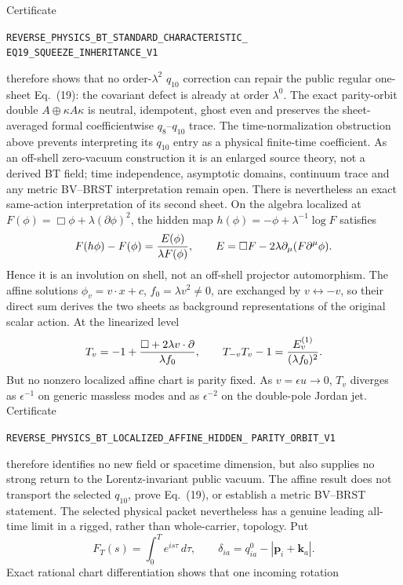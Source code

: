 \documentclass[11pt]{article}
\theoremstyle{definition}
\theoremstyle{remark}
\begin{document}
Certificate
\par\noindent
\texttt{REVERSE\_PHYSICS\_BT\_STANDARD\_CHARACTERISTIC\_}\allowbreak
\texttt{EQ19\_SQUEEZE\_INHERITANCE\_V1}
\par\noindent
therefore shows that no order-\(\lambda^2\) \(q_{10}\) correction can repair
the public regular one-sheet Eq.~(19): the covariant defect is already at
order \(\lambda^0\).  The exact parity-orbit double
\(A\oplus\kappa A\kappa\) is neutral, idempotent, ghost even and preserves the
sheet-averaged formal coefficientwise \(q_8\)--\(q_{10}\) trace.  The
time-normalization obstruction above prevents interpreting its \(q_{10}\)
entry as a physical finite-time coefficient.  As an off-shell
zero-vacuum construction it is an enlarged source theory, not a derived BT
field; time independence, asymptotic domains, continuum trace and any metric
BV--BRST interpretation remain open.
There is nevertheless an exact same-action interpretation of its second
sheet.  On the algebra localized at
\(F(\phi)=\Box\phi+\lambda(\partial\phi)^2\), the hidden map
\(h(\phi)=-\phi+\lambda^{-1}\log F\) satisfies
\[
 F(h\phi)-F(\phi)={E(\phi)\over\lambda F(\phi)},
 \qquad
 E=\Box F-2\lambda\partial_\mu(F\partial^\mu\phi).
\]
Hence it is an involution on shell, not an off-shell projector automorphism.
The affine solutions \(\phi_v=v\mathbin{\cdot}x+c\),
\(f_0=\lambda v^2\ne0\), are exchanged by \(v\leftrightarrow-v\), so their
direct sum derives the two sheets as background representations of the
original scalar action.  At the linearized level
\[
 T_v=-1+{\Box+2\lambda v\mathbin{\cdot}\partial\over\lambda f_0},
 \qquad
 T_{-v}T_v-1={E_v^{(1)}\over(\lambda f_0)^2}.
\]
But no nonzero localized affine chart is parity fixed.  As
\(v=\epsilon u\to0\), \(T_v\) diverges as \(\epsilon^{-1}\) on generic
massless modes and as \(\epsilon^{-2}\) on the double-pole Jordan jet.
Certificate
\par\noindent
\texttt{REVERSE\_PHYSICS\_BT\_LOCALIZED\_AFFINE\_HIDDEN\_}
\allowbreak\texttt{PARITY\_ORBIT\_V1}
\par\noindent
therefore identifies no new field or spacetime dimension, but also supplies
no strong return to the Lorentz-invariant public vacuum.  The affine result
does not transport the selected \(q_{10}\), prove Eq.~(19), or establish a
metric BV--BRST statement.
The selected physical packet nevertheless has a genuine leading all-time
limit in a rigged, rather than whole-carrier, topology.  Put
\[
 F_T(s)=\int_0^T e^{is\tau}\,d\tau,\qquad
 \delta_{ia}=q_{ia}^0-|\mathbf p_i+\mathbf k_a|.
\]
Exact rational chart differentiation shows that one incoming rotation
\end{document}
